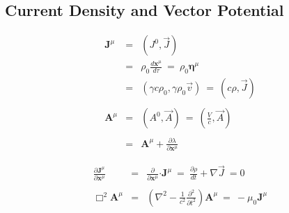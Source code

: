 \documentclass[12pt]{article}
\newcommand{\dotP}{\boldsymbol \cdot}		%
\newcommand{\contra}[1]{\boldsymbol {#1}^{\mu}}	%
\begin{document}
\subsection{Current Density and Vector Potential}
\begin{minipage}{0.45\textwidth}
	\begin{eqnarray*}
	\contra{J} &=& (J^0, \vec{J}) \\[5pt]
		&=& \rho_0 \frac{d\contra{x}}{d\tau} \ =\  \rho_0 \contra{\eta} \\
		&=& (\gamma c \rho_0, \gamma \rho_0 \vec{v}) \ =\  (c \rho, \vec{J}) \\ \\
	\contra{A} &=& (A^0, \vec{A}) \ =\ \left( \tfrac{V}{c}, \vec{A} \right) \\ \\
		&=& \contra{A} + \frac{\partial \lambda}{\partial \contra{x}}
	\end{eqnarray*}
\end{minipage}
\hfill
\begin{minipage}{0.49\textwidth}
	\begin{eqnarray*}
	\frac{\partial \contra{J}}{\partial \contra{x}} &=& \frac{\partial}{\partial \contra{x}} \dotP \contra{J} \ =\ \frac{\partial \rho}{dt}+\nabla \vec{J}\ = 0 \\ \\
	\Box^2 \contra{A} &=& \left( \nabla^2 - \frac{1}{c^2}\frac{\partial^2}{\partial t^2} \right) \contra{A} \ =\ -\mu_0 \contra{J}
 	\end{eqnarray*}
\end{minipage}
\end{document}
